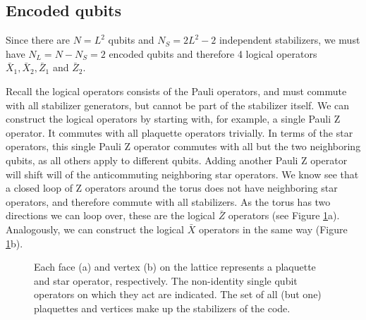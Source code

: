 \subsection{Encoded qubits}
Since there are $N = L^2$ qubits and $N_S = 2L^2 - 2$ independent stabilizers, we must have $N_L = N - N_S = 2$ encoded qubits and therefore 4 logical operators $\bar{X}_1, \bar{X}_2, \bar{Z}_1$ and $\bar{Z}_2$. 

Recall the logical operators consists of the Pauli operators, and must commute with all stabilizer generators, but cannot be part of the stabilizer itself. We can construct the logical operators by starting with, for example, a single Pauli Z operator. It commutes with all plaquette operators trivially. In terms of the star operators, this single Pauli Z operator commutes with all but the two neighboring qubits, as all others apply to different qubits. Adding another Pauli Z operator will shift will of the anticommuting neighboring star operators. We know see that a closed loop of Z operators around the torus does not have neighboring star operators, and therefore commute with all stabilizers. As the torus has two directions we can loop over, these are the logical $\bar{Z}$ operators (see Figure \ref{fig:sf_logical}a). Analogously, we can construct the logical $\bar{X}$ operators in the same way (Figure \ref{fig:sf_logical}b).

\def\QS{10}
\def\s{1}
\begin{figure}
  \centering
  \hspace{1cm}
  \caption{Each face (a) and vertex (b) on the lattice represents a plaquette and star operator, respectively. The non-identity single qubit operators on which they act are indicated. The set of all (but one) plaquettes and vertices make up the stabilizers of the code. }\label{fig:sf_logical}
\end{figure}

